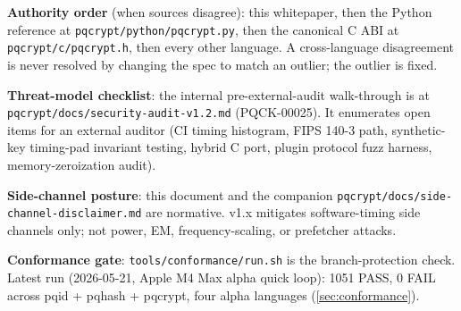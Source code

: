 \textbf{Authority order} (when sources disagree): this whitepaper, then the Python reference at \texttt{pqcrypt/python/pqcrypt.py}, then the canonical C ABI at \texttt{pqcrypt/c/pqcrypt.h}, then every other language. A cross-language disagreement is never resolved by changing the spec to match an outlier; the outlier is fixed.

\textbf{Threat-model checklist}: the internal pre-external-audit walk-through is at \texttt{pqcrypt/docs/security-audit-v1.2.md} (PQCK-00025). It enumerates open items for an external auditor (CI timing histogram, FIPS 140-3 path, synthetic-key timing-pad invariant testing, hybrid C port, plugin protocol fuzz harness, memory-zeroization audit).

\textbf{Side-channel posture}: this document and the companion \texttt{pqcrypt/docs/side-channel-disclaimer.md} are normative. v1.x mitigates software-timing side channels only; not power, EM, frequency-scaling, or prefetcher attacks.

\textbf{Conformance gate}: \texttt{tools/conformance/run.sh} is the branch-protection check. Latest run (2026-05-21, Apple M4 Max alpha quick loop): 1051 PASS, 0 FAIL across pqid + pqhash + pqcrypt, four alpha languages (\cref{sec:conformance}).
